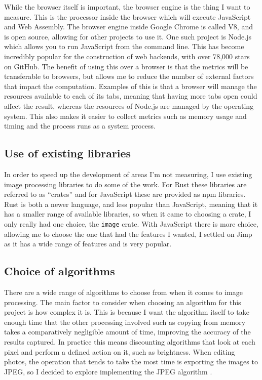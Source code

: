 \documentclass[12pt,a4paper]{article}
\begin{document}
While the browser itself is important, the browser engine is the thing I want to measure. This is the processor inside the browser which will execute JavaScript and Web Assembly. The browser engine inside Google Chrome is called V8, and is open source, allowing for other projects to use it. One such project is Node.js which allows you to run JavaScript from the command line. This has become incredibly popular for the construction of web backends, with over 78,000 stars on GitHub. The benefit of using this over a browser is that the metrics will be transferable to browsers, but allows me to reduce the number of external factors that impact the computation. Examples of this is that a browser will manage the resources available to each of its tabs, meaning that having more tabs open could affect the result, whereas the resources of Node.js are managed by the operating system. This also makes it easier to collect metrics such as memory usage and timing and the process runs as a system process.

\subsection{Use of existing libraries}

In order to speed up the development of areas I'm not measuring, I use existing image processing libraries to do some of the work. For Rust these libraries are referred to as “crates” and for JavaScript these are provided as npm libraries. Rust is both a newer language, and less popular than JavaScript, meaning that it has a smaller range of available libraries, so when it came to choosing a crate, I only really had one choice, the \texttt{image} crate. With JavaScript there is more choice, allowing me to choose the one that had the features I wanted, I settled on Jimp as it has a wide range of features and is very popular.


\subsection{Choice of algorithms}

There are a wide range of algorithms to choose from when it comes to image processing. The main factor to consider when choosing an algorithm for this project is how complex it is. This is because I want the algorithm itself to take enough time that the other processing involved such as copying from memory takes a comparatively negligible amount of time, improving the accuracy of the results captured. In practice this means discounting algorithms that look at each pixel and perform a defined action on it, such as brightness. When editing photos, the operation that tends to take the most time is exporting the images to JPEG, so I decided to explore implementing the JPEG algorithm \cite{jpeg}.
\end{document}
